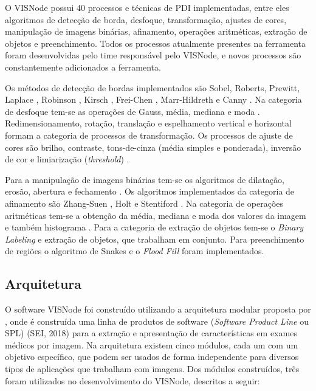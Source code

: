 \documentclass[
	12pt,				%
	oneside,			%
	a4paper,			%
	english,			%
	french,				%
	spanish,			%
	brazil,				%
	]{abntex2}
\newcommand{\vnNumeroTotalProcessos}{40}
\begin{document}
O VISNode possui \vnNumeroTotalProcessos{} processos e técnicas de PDI implementadas, entre eles algoritmos de detecção de borda, desfoque, transformação, ajustes de cores, manipulação de imagens binárias, afinamento, operações aritméticas, extração de objetos e preenchimento. Todos os processos atualmente presentes na ferramenta foram desenvolvidas pelo time responsável pelo VISNode, e novos processos são constantemente adicionados a ferramenta.

Os métodos de detecção de bordas implementados são Sobel, Roberts, Prewitt, Laplace \cite{gonzalesWoods:2008}, Robinson \cite{robinson1977edge}, Kirsch \cite{kirsch1971computer}, Frei-Chen \cite{chen1977fast}, Marr-Hildreth \cite{marr1980theory} e Canny \cite{canny:1986}. Na categoria de desfoque tem-se as operações de Gauss, média, mediana e moda \cite{gonzalesWoods:2008}. Redimensionamento, rotação, translação e espelhamento vertical e horizontal \cite{gonzalesWoods:2008} formam a categoria de processos de transformação. Os processos de ajuste de cores são brilho, contraste, tons-de-cinza (média simples e ponderada), inversão de cor e limiarização (\textit{threshold})  \cite{gonzalesWoods:2008}. 

Para a manipulação de imagens binárias tem-se os algoritmos de dilatação, erosão, abertura e fechamento \cite{gonzalesWoods:2008}. Os algoritmos implementados da categoria de afinamento são Zhang-Suen \cite{zhang1984fast}, Holt \cite{holt1987improved} e Stentiford \cite{stentiford1983some}. Na categoria de operações aritméticas tem-se a obtenção da média, mediana e moda dos valores da imagem e também histograma \cite{gonzalesWoods:2008}. Para a categoria de extração de objetos tem-se o \textit{Binary Labeling} \cite{gonzalesWoods:2008} e extração de objetos, que trabalham em conjunto. Para preenchimento de regiões o algoritmo de Snakes \cite{kass:1988} e o \textit{Flood Fill} \cite{gonzalesWoods:2008} foram implementados.

\subsection{Arquitetura}

O software VISNode foi construído utilizando a arquitetura modular proposta por \citet{reisferramenta}, onde é construída uma linha de produtos de software (\textit{Software Product Line} ou SPL) (SEI, 2018)  para a extração e apresentação de características em exames médicos por imagem. Na arquitetura existem cinco módulos, cada um com um objetivo específico, que podem ser usados de forma independente para diversos tipos de aplicações que trabalham com imagens. Dos módulos construídos, três foram utilizados no desenvolvimento do VISNode, descritos a seguir:
\end{document}
